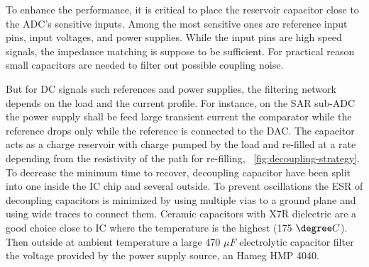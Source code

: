 To enhance the performance, it is critical to place the reservoir capacitor close to the ADC’s sensitive inputs. Among the most sensitive ones are reference input pins, input voltages, and power supplies. While the input pins are high speed signals, the impedance matching is suppose to be sufficient. For practical reason small capacitors are needed to filter out possible coupling noise. 

But for DC signals such references and power supplies, the filtering network depends on the load and the current profile. For instance, on the SAR sub-ADC the power supply shall be feed large transient current the comparator while the reference drops only while the reference is connected to the DAC\@. The capacitor acts as a charge reservoir with charge pumped by the load and re-filled at a rate depending from the resistivity of the path for re-filling, \figurename~\ref{fig:decoupling-strategy}. To decrease the minimum time to recover, decoupling capacitor have been split into one inside the IC chip and several outside. To prevent oscillations the ESR of decoupling capacitors is minimized by using multiple vias to a ground plane and using wide traces to connect them. Ceramic capacitors with X7R dielectric are a good choice close to IC where the temperature is the highest (175 \(\degree C\)). Then outside at ambient temperature a large 470 \(\mu F\) electrolytic capacitor filter the voltage provided by the power supply source, an Hameg HMP 4040. 

